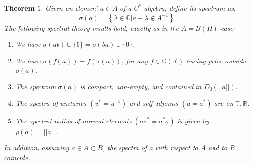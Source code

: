 \documentclass[12pt]{amsbook}
\newtheorem{theorem}{Theorem}[chapter]
\begin{document}
\begin{theorem}
Given an element $a\in A$ of a $C^*$-algebra, define its spectrum as:
$$\sigma(a)=\left\{\lambda\in\mathbb C\Big|a-\lambda\notin A^{-1}\right\}$$
The following spectral theory results hold, exactly as in the $A=B(H)$ case:
\begin{enumerate}
\item We have $\sigma(ab)\cup\{0\}=\sigma(ba)\cup\{0\}$.

\item We have $\sigma(f(a))=f(\sigma(a))$, for any $f\in\mathbb C(X)$ having poles outside $\sigma(a)$.

\item The spectrum $\sigma(a)$ is compact, non-empty, and contained in $D_0(||a||)$.

\item The spectra of unitaries $(u^*=u^{-1})$ and self-adjoints $(a=a^*)$ are on $\mathbb T,\mathbb R$.

\item The spectral radius of normal elements $(aa^*=a^*a)$ is given by $\rho(a)=||a||$.
\end{enumerate}
In addition, assuming $a\in A\subset B$, the spectra of $a$ with respect to $A$ and to $B$ coincide.
\end{theorem}
\end{document}
